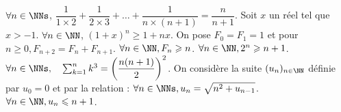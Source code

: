 %
%
	\begin{tasks}
	\task \Mq $\forall n \in \NNs$, $\dfrac{1}{1\times 2}+\dfrac{1}{2\times 3}+\dots+\dfrac{1}{n\times (n+1)}=\dfrac{n}{n+1}$.
	\task Soit $x$ un réel tel que $x>-1$. \Mq  $\forall n \in \NN$, $(1+x)^n\geqslant 1+nx$.
	\task On pose $F_0=F_1= 1$ et pour $n\geqslant 0,F_{n+2}=F_n+F_{n+1}$. \Mq  $ \forall n\in \NN, F_n\geqslant n$.
	\task \Mq $\forall n \in \NN, 2^n \geqslant n+1$.
	\task \Mq $\forall n\in \NNs, \quad \sum_{k=1}^n k^3=\left(\dfrac{n(n+1)}{2}\right)^2$.
	\task On considère la suite $(u_n)_{n\in \NN}$ définie par $u_0=0$ et par la relation : $\forall n \in \NNs, u_n=\sqrt{n^2+u_{n-1}}$. \Mq $\forall n \in \NN, u_n \leqslant n+ 1$.
	\end{tasks}
